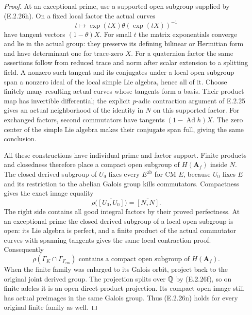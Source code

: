 \begin{proof}
At an exceptional prime, use a supported open
subgroup supplied by (E.2.26h). On a fixed local
factor the actual curves
\[
 t\longmapsto\exp(tX)\theta(\exp(tX))^{-1}
\]
have tangent vectors \((1-\theta)X\). For small
\(t\) the matrix exponentials converge and lie
in the actual group: they preserve its defining
bilinear or Hermitian form and have determinant
one for trace-zero \(X\). For a quaternion factor
the same assertions follow from reduced trace
and norm after scalar extension to a splitting
field. A nonzero such tangent and its conjugates
under a local open subgroup span a nonzero ideal
of the local simple Lie algebra, hence all of it.
Choose finitely many resulting actual curves
whose tangents form a basis. Their product map
has invertible differential; the explicit
\(p\)-adic contraction argument of E.2.25 gives
an actual neighborhood of the identity in \(N\)
on this supported factor. For exchanged factors,
second commutators have tangents
\((1-\operatorname{Ad}h)X\). The zero center of
the simple Lie algebra makes their conjugate
span full, giving the same conclusion.

All these constructions have individual prime
and factor support. Finite products and closedness
therefore place a compact open subgroup of
\(H(\mathbf A_f)\) inside \(N\).
The closed derived subgroup of \(U_0\) fixes
every \(E^{\mathrm{ab}}\) for CM \(E\), because
\(U_0\) fixes \(E\) and its restriction to
the abelian Galois group kills commutators.
Compactness gives the exact image equality
\[
 \rho\bigl(\overline{[U_0,U_0]}\bigr)
          =\overline{[N,N]}.
 \tag{E.2.26m}
\]
The right side contains all good integral factors
by their proved perfectness. At an exceptional
prime the closed derived subgroup of a local
open subgroup is open: its Lie algebra is
perfect, and a finite product of the actual
commutator curves with spanning tangents gives
the same local contraction proof. Consequently
\[
 \rho(\Gamma_K\cap\Gamma_{F_{\mathrm{cm}}})
       \text{ contains a compact open subgroup of }
       H(\mathbf A_f).
 \tag{E.2.26n}
\]
When the finite family was enlarged to its Galois
orbit, project back to the original joint derived
group. The projection splits over \(\mathbb Q\) by
(E.2.26f), so on finite adeles it is an open
direct-product projection. Its compact open
image still has actual preimages in the same
Galois group. Thus (E.2.26n) holds for every
original finite family as well.


\end{proof}
